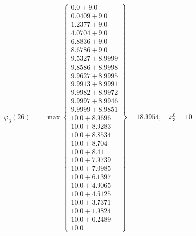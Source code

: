 \documentclass{article}
\begin{document}
\begin{align*}
\varphi_{3}(26) &= \max \left\{ \begin{array}{c}
0.0 + 9.0 \\
 0.0409 + 9.0 \\
 1.2377 + 9.0 \\
 4.0704 + 9.0 \\
 6.8836 + 9.0 \\
 8.6786 + 9.0 \\
 9.5327 + 8.9999 \\
 9.8586 + 8.9998 \\
 9.9627 + 8.9995 \\
 9.9913 + 8.9991 \\
 9.9982 + 8.9972 \\
 9.9997 + 8.9946 \\
 9.9999 + 8.9851 \\
 10.0 + 8.9696 \\
 10.0 + 8.9283 \\
 10.0 + 8.8534 \\
 10.0 + 8.704 \\
 10.0 + 8.41 \\
 10.0 + 7.9739 \\
 10.0 + 7.0985 \\
 10.0 + 6.1397 \\
 10.0 + 4.9065 \\
 10.0 + 4.6125 \\
 10.0 + 3.7371 \\
 10.0 + 1.9824 \\
 10.0 + 0.2489 \\
 10.0
\end{array} \right\}=18.9954, \quad x_{3}^0=10\\
  

\end{align*}
\end{document}
